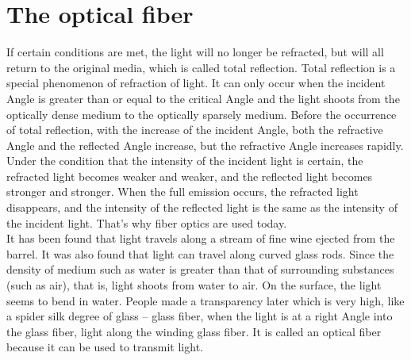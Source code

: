 \documentclass[a4paper]{article}
\begin{document}
\section{The optical fiber}
\label{sec:Sec5}
If certain conditions are met, the light will no longer be refracted, but will all return to the original media, which is called total reflection. Total reflection is a special phenomenon of refraction of light. It can only occur when the incident Angle is greater than or equal to the critical Angle and the light shoots from the optically dense medium to the optically sparsely medium. Before the occurrence of total reflection, with the increase of the incident Angle, both the refractive Angle and the reflected Angle increase, but the refractive Angle increases rapidly. Under the condition that the intensity of the incident light is certain, the refracted light becomes weaker and weaker, and the reflected light becomes stronger and stronger. When the full emission occurs, the refracted light disappears, and the intensity of the reflected light is the same as the intensity of the incident light. That's why fiber optics are used today.
\\

It has been found that light travels along a stream of fine wine ejected from the barrel. It was also found that light can travel along curved glass rods. Since the density of medium such as water is greater than that of surrounding substances (such as air), that is, light shoots from water to air. On the surface, the light seems to bend in water. People made a transparency later which is very high, like a spider silk degree of glass -- glass fiber, when the light is at a right Angle into the glass fiber, light along the winding glass fiber. It is called an optical fiber because it can be used to transmit light.
\\
\end{document}
